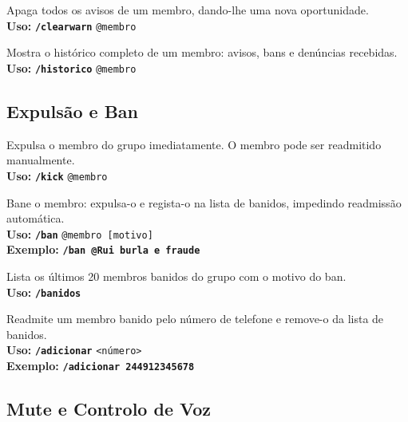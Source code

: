 \documentclass[12pt,a4paper]{article}
\newcommand{\cmd}[1]{\texttt{\textcolor{orbisblue}{\textbf{#1}}}}
\newcommand{\param}[1]{\texttt{\textcolor{orbisMid}{#1}}}
\begin{document}
\begin{tcolorbox}[cmdbox, title={\faBroom\ /clearwarn}]
Apaga todos os avisos de um membro, dando-lhe uma nova oportunidade.\\
\textbf{Uso:} \cmd{/clearwarn} \param{@membro}
\end{tcolorbox}

\begin{tcolorbox}[cmdbox, title={\faHistory\ /historico}]
Mostra o histórico completo de um membro: avisos, bans e denúncias recebidas.\\
\textbf{Uso:} \cmd{/historico} \param{@membro}
\end{tcolorbox}

\subsection{Expulsão e Ban}

\begin{tcolorbox}[cmdbox, title={\faUserMinus\ /kick}]
Expulsa o membro do grupo imediatamente. O membro pode ser readmitido manualmente.\\
\textbf{Uso:} \cmd{/kick} \param{@membro}
\end{tcolorbox}

\begin{tcolorbox}[cmdbox, title={\faHammer\ /ban}]
Bane o membro: expulsa-o e regista-o na lista de banidos, impedindo readmissão automática.\\
\textbf{Uso:} \cmd{/ban} \param{@membro [motivo]}\\
\textbf{Exemplo:} \cmd{/ban @Rui burla e fraude}
\end{tcolorbox}

\begin{tcolorbox}[cmdbox, title={\faList\ /banidos}]
Lista os últimos 20 membros banidos do grupo com o motivo do ban.\\
\textbf{Uso:} \cmd{/banidos}
\end{tcolorbox}

\begin{tcolorbox}[cmdbox, title={\faUserPlus\ /adicionar}]
Readmite um membro banido pelo número de telefone e remove-o da lista de banidos.\\
\textbf{Uso:} \cmd{/adicionar} \param{<número>}\\
\textbf{Exemplo:} \cmd{/adicionar 244912345678}
\end{tcolorbox}

\subsection{Mute e Controlo de Voz}
\end{document}
